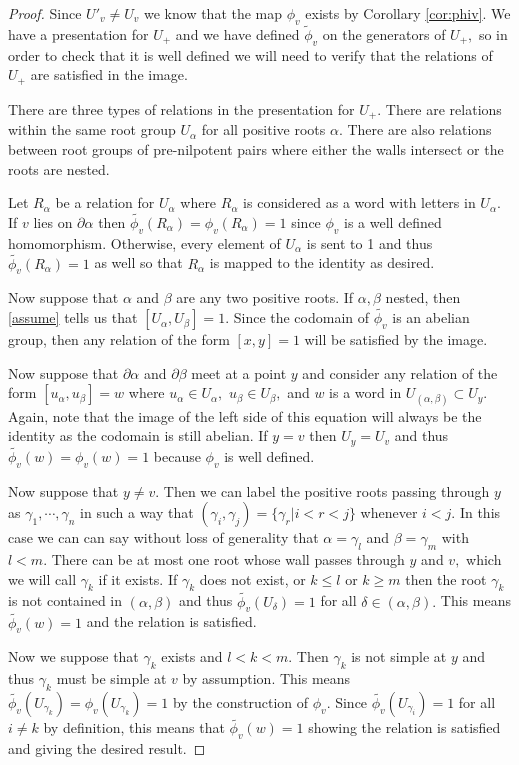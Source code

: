 \documentclass[class=book, crop=false,12 pt]{standalone}
\begin{document}
\begin{proof}
	Since $U'_v\neq U_v$ we know that the map $\phi_v$ exists by Corollary \ref{cor:phiv}. We have a presentation for $U_+$ and we have defined $\tilde{\phi}_v$ on the generators of $U_+,$ so in order to check that it is well defined we will need to verify that the relations of $U_+$ are satisfied in the image.

	There are three types of relations in the presentation for $U_+.$ There are relations within the same root group $U_\alpha$ for all positive roots $\alpha.$ There are also relations between root groups of pre-nilpotent pairs where either the walls intersect or the roots are nested.

	Let $R_\alpha$ be a relation for $U_\alpha$ where $R_\alpha$ is considered as a word with letters in $U_\alpha.$ If $v$ lies on $\partial \alpha$ then $\tilde{\phi_v}(R_\alpha)=\phi_v(R_\alpha)=1$ since $\phi_v$ is a well defined homomorphism. Otherwise, every element of $U_\alpha$ is sent to 1 and thus $\tilde{\phi_v}(R_\alpha)=1$ as well so that $R_\alpha$ is mapped to the identity as desired.

	Now suppose that $\alpha$ and $\beta$ are any two positive roots. If $\alpha,\beta$ nested, then \eqref{assume} tells us that $[U_\alpha,U_\beta]=1.$ Since the codomain of $\tilde{\phi_v}$ is an abelian group, then any relation of the form $[x,y]=1$ will be satisfied by the image.


	Now suppose that $\partial \alpha$ and $\partial \beta$ meet at a point $y$ and consider any relation of the form $[u_\alpha,u_\beta]=w$ where $u_\alpha\in U_\alpha,$ $u_\beta\in U_\beta,$ and $w$ is a word in $U_{(\alpha,\beta)}\subset U_y.$ Again, note that the image of the left side of this equation will always be the identity as the codomain is still abelian. If $y=v$ then $U_y=U_v$ and thus $\tilde{\phi_v}(w)=\phi_v(w)=1$ because $\phi_v$ is well defined.

	Now suppose that $y\neq v.$ Then we can label the positive roots passing through $y$ as $\gamma_1,\cdots,\gamma_n$ in such a way that $(\gamma_i,\gamma_j)=\{\gamma_{r}|i<r<j\}$ whenever $i<j.$ In this case we can can say without loss of generality that $\alpha=\gamma_l$ and $\beta=\gamma_m$ with $l<m.$  There can be at most one root whose wall passes through $y$ and $v,$ which we will call $\gamma_k$ if it exists. If $\gamma_k$ does not exist, or $k\le l$ or $k\ge m$ then the root $\gamma_k$ is not contained in $(\alpha,\beta)$ and thus $\tilde{\phi_v}(U_\delta)=1$ for all $\delta\in (\alpha,\beta).$ This means $\tilde{\phi_v}(w)=1$ and the relation is satisfied.

	Now we suppose that $\gamma_k$ exists and $l<k<m.$ Then $\gamma_k$ is not simple at $y$ and thus $\gamma_k$ must be simple at $v$ by assumption. This means $\tilde{\phi_v}(U_{\gamma_k})=\phi_v(U_{\gamma_k})=1$ by the construction of $\phi_v.$ Since $\tilde{\phi_v}(U_{\gamma_i})=1$ for all $i\neq k$ by definition, this means that $\tilde{\phi_v}(w)=1$ showing the relation is satisfied and giving the desired result.
\end{proof}
\end{document}
